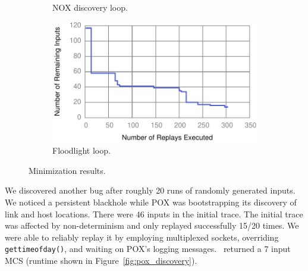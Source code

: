 \begin{figure}[!htb]
\begin{subfigure}{0.33\textwidth}
    \caption[]{\label{fig:nox_discovery} NOX discovery loop. }
\end{subfigure}\hfill
\begin{subfigure}{0.33\textwidth}
    \includegraphics[width=\textwidth]{../graphs/runtime/floodlight_loop.pdf}
    \caption[]{\label{fig:fl_loop} Floodlight loop. }
\end{subfigure}
\caption{Minimization results.}
\end{figure}

 We discovered another bug
after roughly 20 runs of randomly generated inputs. We noticed a persistent
blackhole while POX was bootstrapping its discovery of link and host locations.
There were $46$ inputs in the initial trace. The initial trace was affected by
non-determinism and only replayed successfully 15/20 times.
We were able to reliably replay it by employing multiplexed sockets, overriding {\tt gettimeofday()},
and waiting on POX's logging messages. \projectname~returned a $7$ input MCS
(runtime shown in Figure~\ref{fig:pox_discovery}).


